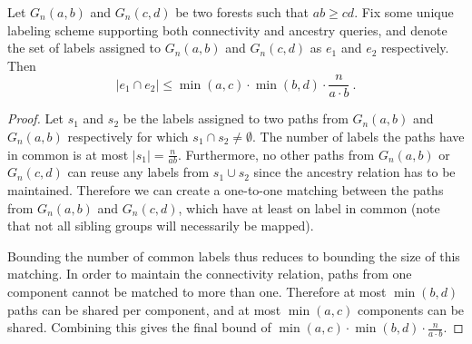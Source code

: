 \documentclass{llncs}
\newcommand{\abs}[1]{\left | #1 \right |}
\begin{document}
\begin{lemma}\label{lem:forest-reuse-con-anc}
    Let $G_n(a,b)$ and $G_n(c,d)$ be two forests such that $ab \ge cd$.
    Fix some unique labeling scheme supporting both
    connectivity and ancestry queries, and denote the set of labels assigned to
    $G_n(a,b)$ and $G_n(c,d)$ as $e_1$ and $e_2$ respectively.
	Then
    \[
        |e_1\cap e_2| \le \min(a,c)\cdot\min(b,d)\cdot\frac{n}{a\cdot b}\ .
    \]
\end{lemma}
\begin{proof}
	Let $s_1$ and $s_2$ be the labels assigned to two paths from $G_n(a,b)$ and
	$G_n(a,b)$ respectively for which $s_1 \cap s_2 \neq \emptyset$.
	The number of labels the paths have in common is at most
	$\abs{s_1} = \frac{n}{ab}$.
	Furthermore,
	no other paths from $G_n(a,b)$ or $G_n(c,d)$ can reuse any labels from
	$s_1 \cup s_2$ since the ancestry relation has to be maintained. Therefore
	we can create a one-to-one matching between the paths from $G_n(a,b)$ and
    $G_n(c,d)$,
    which have at least on label in common (note that not all sibling groups will
    necessarily be mapped).

    Bounding the number of common labels thus reduces to
    bounding the size of this matching.
    In order to  maintain the connectivity relation, paths from one
    component cannot be matched to more than one. Therefore at most $\min(b,d)$
    paths can be shared per component, and at most $\min(a,c)$ components
    can be shared. Combining this gives the final bound of
    $\min(a,c)\cdot\min(b,d)\cdot\frac{n}{a\cdot b}$.
\end{proof}
\end{document}

